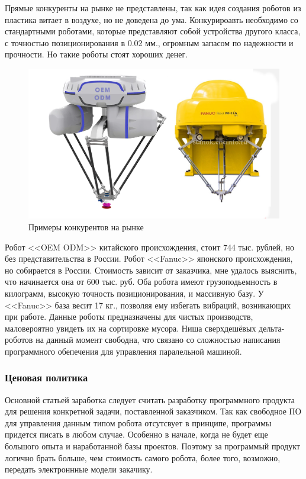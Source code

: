 Прямые конкуренты на рынке не представлены, так как идея создания роботов из пластика витает в воздухе, но не доведена до ума. Конкурироавть необходимо со стандартными роботами, которые представляют собой устройства другого класса, с точностью позиционирования в 0.02 мм., огромным запасом по надежности и прочности. Но такие роботы стоят хороших денег.

\begin{figure}[h]
\centering
\includegraphics[width=0.8\linewidth]{./image/odm}
\caption{Примеры конкурентов на рынке}
\end{figure} 

Робот <<OEM ODM>> китайского происхождения, стоит 744 тыс. рублей, но без представительства в России. Робот <<Fanuc>> японского происхождения, но собирается в России. Стоимость зависит от заказчика, мне удалось выяснить, что начинается она от 600 тыс. руб. Оба робота имеют грузоподьемность в килограмм, высокую точность позиционирования, и массивную базу. У <<Fanuc>> база весит 17 кг., позволяя ему избегать вибраций, возникающих при работе. Данные роботы предназначены для чистых производств, маловероятно увидеть их на сортировке мусора. Ниша сверхдешёвых дельта-роботов на данный момент свободна, что связано со сложностью написания программного обепечения для управления паралельной машиной.

\subsubsection{Ценовая политика}

Основной статьей заработка следует считать разработку программного продукта для решения конкретной задачи, поставленной заказчиком. Так как свободное ПО для управления данным типом робота отсутсвует в принципе, программы придется писать в любом случае. Особенно в начале, когда не будет еще большого опыта и наработанной базы проектов. Поэтому за программый продукт логично брать больше, чем стоимость самого робота, более того, возможно, передать электроннные модели закачику.

